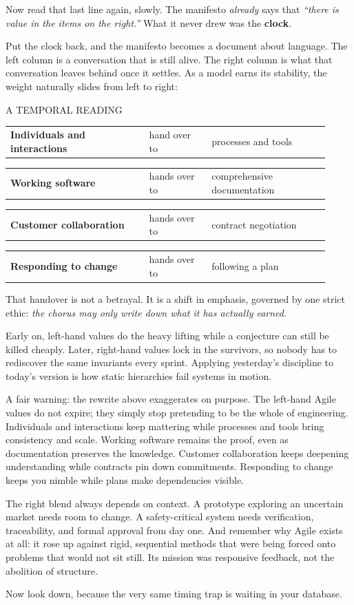 \documentclass[10pt,a4paper]{article}
\makeatletter
\newcommand{\Pair}[3]{%
  \par\noindent
  \begin{tabular}{@{}p{0.40\linewidth}@{\hspace{2mm}}p{0.18\linewidth}@{\hspace{2mm}}p{0.34\linewidth}@{}}
    \sffamily\bfseries #1 & \ttfamily\scriptsize\textcolor{G2}{#2} & \sffamily #3
  \end{tabular}\par
  \vspace{1.4mm}%
}
\makeatother
\begin{document}
Now read that last line again, slowly. The manifesto \emph{already} says that \emph{“there is value in the items on the right.”} What it never drew was the \textbf{clock}.

Put the clock back, and the manifesto becomes a document about language. The left column is a conversation that is still alive. The right column is what that conversation leaves behind once it settles. As a model earns its stability, the weight naturally slides from left to right:

\begin{manifesto}{A TEMPORAL READING}
\Pair{Individuals and interactions}{hand over to}{processes and tools}
\Pair{Working software}{hands over to}{comprehensive documentation}
\Pair{Customer collaboration}{hands over to}{contract negotiation}
\Pair{Responding to change}{hands over to}{following a plan}
\end{manifesto}

That handover is not a betrayal. It is a shift in emphasis, governed by one strict ethic: \emph{the chorus may only write down what it has actually earned.}

Early on, left-hand values do the heavy lifting while a conjecture can still be killed cheaply. Later, right-hand values lock in the survivors, so nobody has to rediscover the same invariants every sprint. Applying yesterday's discipline to today's version is how static hierarchies fail systems in motion.

A fair warning: the rewrite above exaggerates on purpose. The left-hand Agile values do not expire; they simply stop pretending to be the whole of engineering. Individuals and interactions keep mattering while processes and tools bring consistency and scale. Working software remains the proof, even as documentation preserves the knowledge. Customer collaboration keeps deepening understanding while contracts pin down commitments. Responding to change keeps you nimble while plans make dependencies visible.

The right blend always depends on context. A prototype exploring an uncertain market needs room to change. A safety-critical system needs verification, traceability, and formal approval from day one. And remember why Agile exists at all: it rose up against rigid, sequential methods that were being forced onto problems that would not sit still. Its mission was responsive feedback, not the abolition of structure.

Now look down, because the very same timing trap is waiting in your database.
\end{document}
